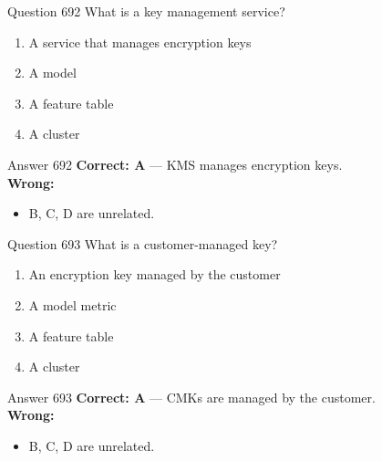 \documentclass[aspectratio=169,11pt]{beamer}
\begin{document}
	\begin{frame}{Question 692}
		What is a key management service?
		\begin{enumerate}[label=\Alph*.]
			\item A service that manages encryption keys
			\item A model
			\item A feature table
			\item A cluster
		\end{enumerate}
	\end{frame}
	\begin{frame}{Answer 692}
		\textbf{Correct: A} --- KMS manages encryption keys.\\
		\vspace{0.5em}
		\textbf{Wrong:}
		\begin{itemize}
			\item B, C, D are unrelated.
		\end{itemize}
	\end{frame}
	
	\begin{frame}{Question 693}
		What is a customer-managed key?
		\begin{enumerate}[label=\Alph*.]
			\item An encryption key managed by the customer
			\item A model metric
			\item A feature table
			\item A cluster
		\end{enumerate}
	\end{frame}
	\begin{frame}{Answer 693}
		\textbf{Correct: A} --- CMKs are managed by the customer.\\
		\vspace{0.5em}
		\textbf{Wrong:}
		\begin{itemize}
			\item B, C, D are unrelated.
		\end{itemize}
	\end{frame}
	
\end{document}
